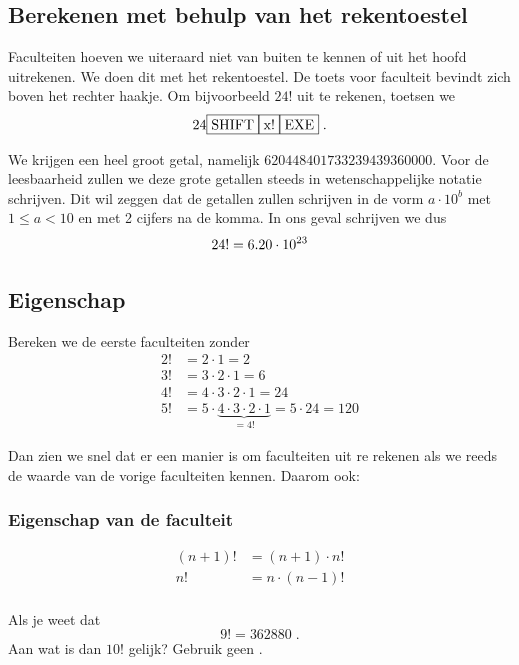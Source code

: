 \documentclass[12pt,a4paper,twoside]{article}
\begin{document}
\subsection{Berekenen met behulp van het rekentoestel}

Faculteiten hoeven we uiteraard niet van buiten te kennen of uit het hoofd uitrekenen. We doen dit met het rekentoestel. De toets voor faculteit bevindt zich boven het rechter haakje. Om bijvoorbeeld $24!$ uit te rekenen, toetsen we
$$24 \zrm{SHIFT} \zrm{x!} \zrm{EXE}\;.$$

We krijgen een heel groot getal, namelijk $620448401733239439360000$. Voor de leesbaarheid zullen we deze grote getallen steeds in wetenschappelijke notatie schrijven. Dit wil zeggen dat de getallen zullen schrijven in de vorm $a \cdot 10^b$ met $1 \leq a < 10$ en met 2 cijfers na de komma. In ons geval schrijven we dus
\[24! = 6.20\cdot 10^{23}\]

\subsection{Eigenschap}

Bereken we de eerste faculteiten zonder 
\begin{align*}
  2! &= 2 \cdot 1 = 2\\
  3! &= 3 \cdot 2 \cdot 1 = 6\\
  4! &= 4 \cdot 3 \cdot 2 \cdot 1 = 24\\
  5! &= 5 \cdot \underbrace{4 \cdot 3 \cdot 2 \cdot 1}_{=4!} = 5 \cdot 24 = 120
\end{align*}

Dan zien we snel dat er een manier is om faculteiten uit re rekenen als we reeds de waarde van de vorige faculteiten kennen. Daarom ook:

\needspace{4cm}
\subsubsection*{Eigenschap van de faculteit}
\begin{mdframed}
\begin{align*}
  (n+1)! &= (n+1) \cdot n!\\
  n!     &= n \cdot (n-1)!\\
\end{align*}
\end{mdframed}

\begin{oefening}
Als je weet dat
$$9!=362880\;.$$
Aan wat is dan $10!$ gelijk? Gebruik geen .
\end{oefening}
\end{document}
